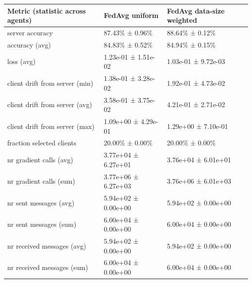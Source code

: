 \begin{tabular}{lll}
\hline
 Metric (statistic across agents)   & FedAvg uniform      & FedAvg data-size weighted   \\
\hline
 server accuracy                    & 87.43\% ± 0.96\%      & 88.64\% ± 0.12\%              \\
 accuracy (avg)                     & 84.83\% ± 0.52\%      & 84.94\% ± 0.15\%              \\
 loss (avg)                         & 1.23e-01 ± 1.51e-02 & 1.03e-01 ± 9.72e-03         \\
 client drift from server (min)     & 1.38e-01 ± 3.28e-02 & 1.92e-01 ± 4.73e-02         \\
 client drift from server (avg)     & 3.58e-01 ± 3.75e-02 & 4.21e-01 ± 2.71e-02         \\
 client drift from server (max)     & 1.09e+00 ± 4.29e-01 & 1.29e+00 ± 7.10e-01         \\
 fraction selected clients          & 20.00\% ± 0.00\%      & 20.00\% ± 0.00\%              \\
 nr gradient calls (avg)            & 3.77e+04 ± 6.27e+01 & 3.76e+04 ± 6.01e+01         \\
 nr gradient calls (sum)            & 3.77e+06 ± 6.27e+03 & 3.76e+06 ± 6.01e+03         \\
 nr sent messages (avg)             & 5.94e+02 ± 0.00e+00 & 5.94e+02 ± 0.00e+00         \\
 nr sent messages (sum)             & 6.00e+04 ± 0.00e+00 & 6.00e+04 ± 0.00e+00         \\
 nr received messages (avg)         & 5.94e+02 ± 0.00e+00 & 5.94e+02 ± 0.00e+00         \\
 nr received messages (sum)         & 6.00e+04 ± 0.00e+00 & 6.00e+04 ± 0.00e+00         \\
\hline
\end{tabular}
